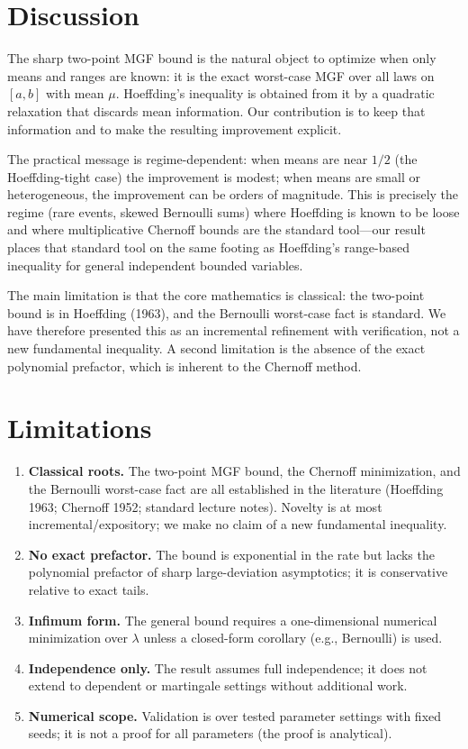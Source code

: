 \documentclass[11pt]{article}
\begin{document}
\section{Discussion}
The sharp two-point MGF bound is the natural object to optimize when only means and ranges are known: it is the exact worst-case MGF over all laws on $[a,b]$ with mean $\mu$. Hoeffding's inequality is obtained from it by a quadratic relaxation that discards mean information. Our contribution is to keep that information and to make the resulting improvement explicit.

The practical message is regime-dependent: when means are near $1/2$ (the Hoeffding-tight case) the improvement is modest; when means are small or heterogeneous, the improvement can be orders of magnitude. This is precisely the regime (rare events, skewed Bernoulli sums) where Hoeffding is known to be loose and where multiplicative Chernoff bounds are the standard tool---our result places that standard tool on the same footing as Hoeffding's range-based inequality for general independent bounded variables.

The main limitation is that the core mathematics is classical: the two-point bound is in Hoeffding (1963), and the Bernoulli worst-case fact is standard. We have therefore presented this as an incremental refinement with verification, not a new fundamental inequality. A second limitation is the absence of the exact polynomial prefactor, which is inherent to the Chernoff method.

\section{Limitations}
\begin{enumerate}
\item \textbf{Classical roots.} The two-point MGF bound, the Chernoff minimization, and the Bernoulli worst-case fact are all established in the literature (Hoeffding 1963; Chernoff 1952; standard lecture notes). Novelty is at most incremental/expository; we make no claim of a new fundamental inequality.
\item \textbf{No exact prefactor.} The bound is exponential in the rate but lacks the polynomial prefactor of sharp large-deviation asymptotics; it is conservative relative to exact tails.
\item \textbf{Infimum form.} The general bound requires a one-dimensional numerical minimization over $\lambda$ unless a closed-form corollary (e.g., Bernoulli) is used.
\item \textbf{Independence only.} The result assumes full independence; it does not extend to dependent or martingale settings without additional work.
\item \textbf{Numerical scope.} Validation is over tested parameter settings with fixed seeds; it is not a proof for all parameters (the proof is analytical).
\end{enumerate}
\end{document}
